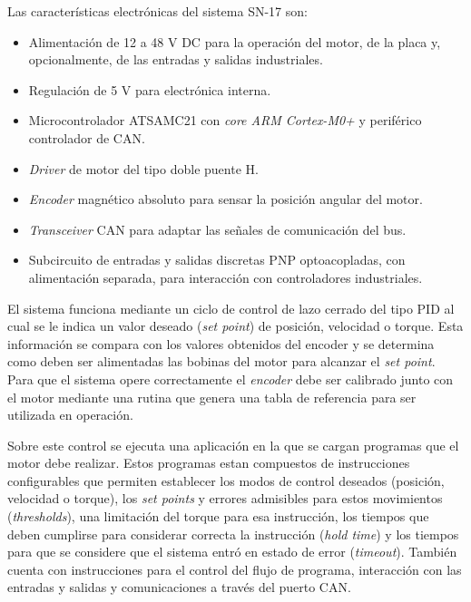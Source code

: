 
Las características electrónicas del sistema SN-17 son:

\begin{itemize}
	\item Alimentación de 12 a 48 V DC para la operación del motor, de la placa y, opcionalmente, de las entradas y salidas industriales.
	\item Regulación de 5 V para electrónica interna.
	\item Microcontrolador ATSAMC21\citep{web_ATSAMC21G18A} con \textit{core ARM Cortex-M0+} y periférico controlador de CAN.
	\item \textit{Driver} de motor del tipo doble puente H\citep{web_A4954}.
	\item \textit{Encoder} magnético absoluto\citep{web_AS5047D} para sensar la posición angular del motor.
	\item \textit{Transceiver} CAN para adaptar las señales de comunicación del bus.
	\item Subcircuito de entradas y salidas discretas PNP optoacopladas\citep{web_optoacopladores_LTV}, con alimentación separada, para interacción con controladores industriales.
\end{itemize}

El sistema funciona mediante un ciclo de control de lazo cerrado del tipo PID\citep{paper_PID_steppers} al cual se le indica un valor deseado (\textit{set point}) de posición, velocidad o torque. Esta información se compara con los valores obtenidos del encoder y se determina como deben ser alimentadas las bobinas del motor para alcanzar el \textit{set point}. Para que el sistema opere correctamente el \textit{encoder} debe ser calibrado junto con el motor mediante una rutina que genera una tabla de referencia para ser utilizada en operación.

Sobre este control se ejecuta una aplicación en la que se cargan programas que el motor debe realizar. Estos programas estan compuestos de instrucciones configurables que permiten establecer los modos de control deseados (posición, velocidad o torque), los \textit{set points} y errores admisibles para estos movimientos (\textit{thresholds}), una limitación del torque para esa instrucción, los tiempos que deben cumplirse para considerar correcta la instrucción (\textit{hold time}) y los tiempos para que se considere que el sistema entró en estado de error (\textit{timeout}). También cuenta con instrucciones para el control del flujo de programa, interacción con las entradas y salidas y comunicaciones a través del puerto CAN.

